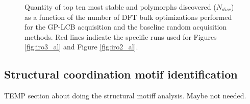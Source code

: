

\begin{figure}[!htb]
\centering
{}
\caption{\label{fig:disc_rate}
%
Quantity of top ten most stable \IrOtwo and \IrOthree polymorphs discovered ($N_{disc}$) as a function of the number of DFT bulk optimizations performed for the GP-LCB acquisition and the baseline random acquisition methods.
%
Red lines indicate the specific runs used for Figures \ref{fig:iro3_al} and Figure \ref{fig:iro2_al}.
}
\end{figure}


\subsection{Structural coordination motif identification} %
%


%
TEMP section about doing the structural motiff analysis. Maybe not needed.


